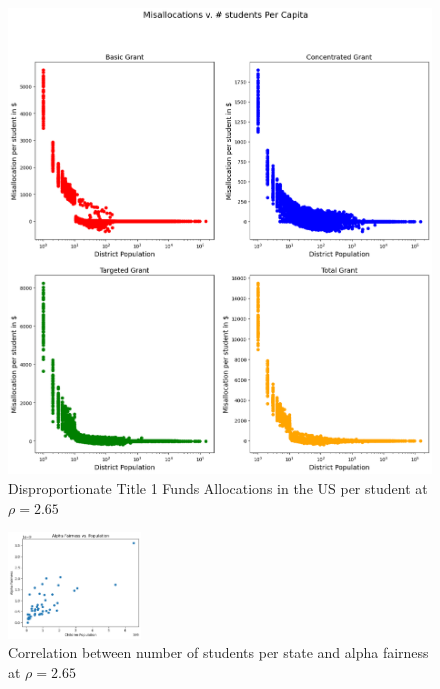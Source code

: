\documentclass[9pt,lineno,twocolumn,twoside]{pnas-new}
\begin{document}
    \begin{figure}[h]
        \centering
        \includegraphics[width=0.7\linewidth]{images/all_grant_errors_per_capita.png}
        \caption{Disproportionate Title 1 Funds Allocations in the US per student at $\rho=2.65$}
        \label{fig:missallocs_perstudent}
    \end{figure}



    \begin{figure}[!ht]
        \centering
        \includegraphics[width=0.48\linewidth, height=80pt]{images/af_vs_pop.png}
        \caption{Correlation between number of students per state and alpha fairness at $\rho=2.65$}
        \label{fig:corr_fair_num_students}
    \end{figure}
\end{document}
